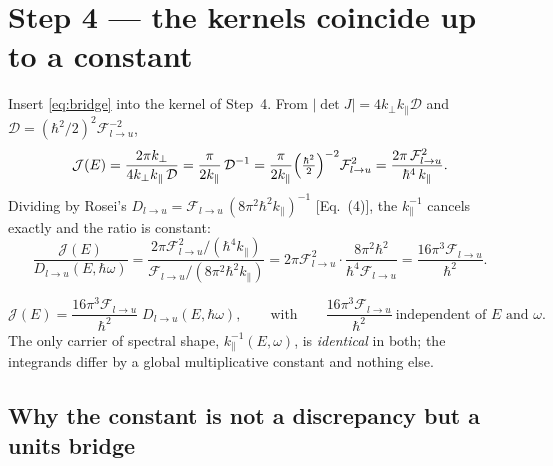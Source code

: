 \documentclass[11pt]{article}
\newcommand{\kperp}{k_{\perp}}
\newcommand{\kpar}{k_{\parallel}}
\newcommand{\hw}{\hbar\omega}
\newcommand{\Dc}{\mathcal{D}}
\newcommand{\Flu}{\mathcal{F}_{l\to u}}
\newcommand{\Jc}{\mathcal{J}}
\newcommand{\Dlu}{D_{l\to u}}
\newcommand{\Rq}[1]{\textcolor{roseicol}{\textnormal{(#1)}}}
\begin{document}
\section{Step 4 --- the kernels coincide up to a constant}
\label{sec:kernel}

Insert \eqref{eq:bridge} into the kernel of Step~4. From $|\det J|=4\kperp\kpar\Dc$ and
$\Dc=(\hbar^2/2)^2\Flu^{-2}$,
%
\begin{equation}
\Jc(E)=\frac{2\pi\kperp}{4\kperp\kpar\,\Dc}
=\frac{\pi}{2\kpar}\,\Dc^{-1}
=\frac{\pi}{2\kpar}\Bigl(\tfrac{\hbar^2}{2}\Bigr)^{-2}\Flu^{2}
=\frac{2\pi\,\Flu^{2}}{\hbar^{4}\,\kpar}.
\label{eq:Jfinal}
\end{equation}
%
Dividing by Rosei's $\Dlu=\Flu\,(8\pi^2\hbar^2\kpar)^{-1}$ [Eq.~\Rq{4}], the
$\kpar^{-1}$ cancels exactly and the ratio is constant:
%
\begin{equation}
\frac{\Jc(E)}{\Dlu(E,\hw)}
=\frac{2\pi\Flu^{2}/(\hbar^{4}\kpar)}{\Flu/(8\pi^{2}\hbar^{2}\kpar)}
=2\pi\Flu^{2}\cdot\frac{8\pi^{2}\hbar^{2}}{\hbar^{4}\Flu}
=\frac{16\pi^{3}\Flu}{\hbar^{2}} .
\label{eq:ratio}
\end{equation}
%
\begin{keybox}
\[
\Jc(E)=\frac{16\pi^{3}\Flu}{\hbar^{2}}\;\Dlu(E,\hw),
\qquad\text{with}\qquad
\frac{16\pi^{3}\Flu}{\hbar^{2}}\ \text{independent of }E\text{ and }\omega .
\]
The only carrier of spectral shape, $\kpar^{-1}(E,\omega)$, is \emph{identical} in both;
the integrands differ by a global multiplicative constant and nothing else.
\end{keybox}

\subsection{Why the constant is not a discrepancy but a units bridge}
\end{document}
